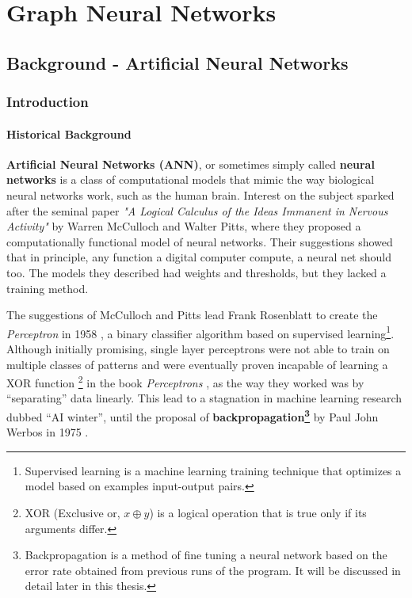 \chapter{Graph Neural Networks} \label{literature}

\section{Background - Artificial Neural Networks}

\subsection{Introduction}

\subsubsection{Historical Background}

\textbf{Artificial Neural Networks (ANN)}, or sometimes simply called
\textbf{neural networks} is a class of computational models that mimic
the way biological neural networks work, such as the human brain. Interest
on the subject sparked after the seminal paper \textit{"A Logical
Calculus of the Ideas Immanent in Nervous Activity"}
\cite{article:McCulloch1943} by Warren McCulloch and Walter Pitts, where
they proposed a computationally functional model of neural networks.
Their suggestions showed that in principle, any function a digital computer
compute, a neural net should too. The models they described had weights
and thresholds, but they lacked a training method. 

The suggestions of McCulloch and Pitts lead Frank Rosenblatt to create
the \textit{Perceptron} in 1958 \cite{article:Rosenblatt1958ThePA}, a
binary classifier algorithm based on supervised
learning\footnote{Supervised learning is a machine learning training
technique that optimizes a model based on examples input-output
pairs.}. Although initially promising, single layer perceptrons were
not able to train on multiple classes of patterns and were eventually
proven incapable of learning a XOR function \footnote{XOR (Exclusive
or, $x\oplus y$) is a logical operation that is true only if its
arguments differ.} in the book \textit{Perceptrons}
\cite{book:minsky1969perceptrons}, as the way they worked was by
``separating'' data linearly. This lead to a stagnation in machine
learning research dubbed ``AI winter'', until the proposal of
\textbf{backpropagation\footnote{Backpropagation is a method of fine
tuning a neural network based on the error rate obtained from previous
runs of the program. It will be discussed in detail later in this
thesis.}} by Paul John Werbos in 1975 \cite{book:werbos1975beyond}.

